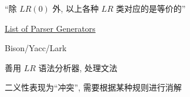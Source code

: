 \begin{frame}{}

  \pause
  \vspace{0.20cm}
  \begin{center}
    ``除 $LR(0)$ 外, 以上各种 $LR$ 类对应的是等价的''
  \end{center}
\end{frame}

\begin{frame}{}
  \begin{center}
    \href{https://en.wikipedia.org/wiki/Comparison_of_parser_generators\#Deterministic_context-free_languages}{List of Parser Generators}

    \vspace{0.50cm}

    \vspace{0.50cm}
    Bison/Yacc/Lark
  \end{center}
\end{frame}

\begin{frame}{}
\end{frame}

\begin{frame}{}
\end{frame}

\begin{frame}{}
  \begin{center}
     善用 $LR$ 语法分析器, 处理文法

    \pause
    \vspace{1.00cm}
     二义性表现为``冲突'', 需要根据某种规则进行消解
  \end{center}
\end{frame}

\begin{frame}{}
  \begin{center}

    \begin{columns}
        
        
    \end{columns}

    
  \end{center}
\end{frame}

